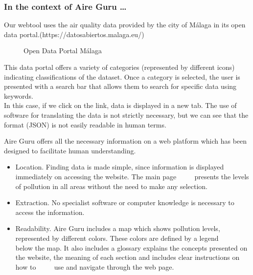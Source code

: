 \subsubsection*{In the context of Aire Guru \ldots} 

Our webtool uses the air quality data provided by the city of Málaga in its open data portal.(https://datosabiertos.malaga.eu/)\\

\begin{figure}[ht]
    \centering
    \hfill
    \vfill
    \caption{Open Data Portal Málaga}
\end{figure}

This data portal offers a variety of categories (represented by different icons) indicating classifications of the dataset.
Once a category is selected, the user is presented with a search bar that allows them to search for specific data using keywords.\\

In this case, if we click on the link, data is displayed in a new tab. The use of software
for translating the data is not strictly necessary, but we can see that the format (JSON) is not easily readable in human terms.

Aire Guru offers all the necessary information on a web platform which has been designed to facilitate human understanding.

\begin{itemize}
    \item Location. Finding data is made simple, since information is displayed immediately on accessing the website. The main page
          presents the levels of pollution in all areas without the need to make any selection.
    \item Extraction. No specialist software or computer knowledge is necessary to access the information.
    \item Readability. Aire Guru includes a map which shows pollution levels, represented by different colors. These colors are defined by a legend
          below the map. It also includes a glossary explains the concepts presented on the website, the meaning of each section and includes clear instructions on how to
          use and navigate through the web page.
\end{itemize}